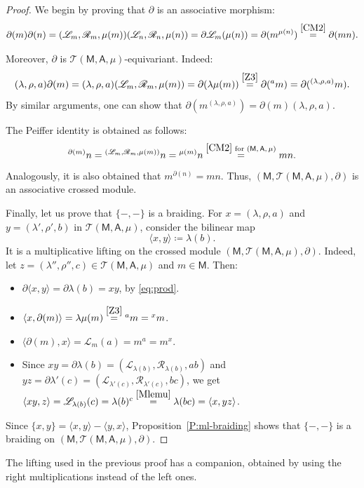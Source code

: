 \documentclass[12pt,reqno]{amsart}
\theoremstyle{plain}
\theoremstyle{definition}
\theoremstyle{remark}
\def\lam{\lambda}
\newcommand{\A}{\ensuremath{\mathsf{A}}}
\newcommand{\MM}{\ensuremath{\mathsf{M}}}
\newcommand{\T}{\ensuremath{\mathcal{T}}}
\newcommand{\LL}{\ensuremath{\mathcal{L}}}
\newcommand{\RR}{\ensuremath{\mathcal{R}}}
\numberwithin{equation}{section}
\begin{document}
\begin{proof}
	We begin by proving that $\partial$ is an associative morphism:
	\[
		\partial(m)\partial(n)=(\LL_m,\RR_m,\mu (m))(\LL_n,\RR_n,\mu (n))=\partial\LL_m(\mu(n))=\partial(m^{\mu(n)})\stackrel{\eqref{CM2}}{=}\partial(mn).
	\]
	
	Moreover, $\partial$ is $\T(\MM,\A,\mu)$-equivariant. Indeed:
	\[
		(\lam,\rho,a)\partial(m)=(\lam,\rho,a)(\LL_m,\RR_m,\mu(m))=\partial(\lambda\mu(m))\stackrel{\eqref{Z3}}{=}\partial({}^{a}m)=\partial({}^{(\lambda,\rho,a)}m).
	\]
	By similar arguments, one can show that $\partial(m^{(\lambda,\rho,a)})=\partial(m)(\lambda,\rho,a)$.
	
	The Peiffer identity is obtained as follows:
	\[
		{}^{\partial(m)}n={}^{(\LL_m,\RR_m,\mu(m))}n={}^{\mu(m)}n\stackrel{\eqref{CM2}\text{ for $(\MM,\A,\mu)$}}{=}mn.
	\]
	Analogously, it is also obtained that $m^{\partial(n)}=mn$. Thus, $(\MM,\T(\MM,\A,\mu),\partial)$ is an associative crossed module.
	
	Finally, let us prove that $\{-,-\}$ is a braiding. For $x=(\lam,\rho,a)$ and $y=(\lam',\rho',b)$ in $\T(\MM,\A,\mu)$, consider the bilinear map
	\[
	\langle x,y\rangle\coloneqq\lam(b).
	\]
	It is a multiplicative lifting on the crossed module $(\MM,\T(\MM,\A,\mu),\partial)$. Indeed, let $z=(\lam'',\rho'',c)\in\T(\MM,\A,\mu)$ and $m\in\MM$. Then:
	\begin{itemize}
		\item[\eqref{ML1}:] $\partial\langle x,y\rangle=\partial\lam(b)=xy$, by \eqref{eq:prod}.
		\item[\eqref{ML2}:] $\langle x,\partial(m)\rangle=\lam\mu(m)\stackrel{\eqref{Z3}}{=}{}^{a}m={}^{x}m$.
		\item[\eqref{ML3}:] $\langle\partial(m),x\rangle=\LL_m(a)=m^{a}=m^{x}$.
		\item[\eqref{ML4}:] Since $xy=\partial\lam(b)=(\LL_{\lam(b)},\RR_{\lam(b)},ab)$ and $yz=\partial\lam'(c)=(\LL_{\lam'(c)},\RR_{\lam'(c)},bc)$, we get $\langle xy,z\rangle=\LL_{\lam(b)}(c)=\lam(b)^{c}\stackrel{\eqref{Mlemu}}{=}\lam(bc)=\langle x,yz\rangle$.
	\end{itemize}
	Since $\{x,y\}=\langle x,y\rangle-\langle y,x\rangle$, Proposition~\ref{P:ml-braiding} shows that $\{-,-\}$ is a braiding on $(\MM,\T(\MM,\A,\mu),\partial)$.
\end{proof}

The lifting used in the previous proof has a companion, obtained by using the right multiplications instead of the left ones.
\end{document}
